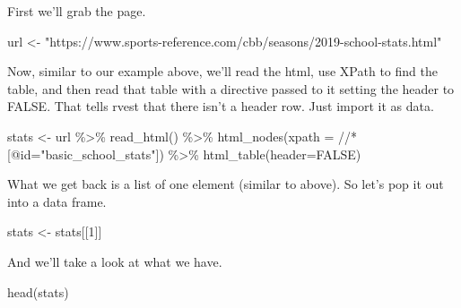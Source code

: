 \documentclass[
]{book}
\newenvironment{Shaded}{\begin{snugshade}}{\end{snugshade}}
\newcommand{\AttributeTok}[1]{\textcolor[rgb]{0.77,0.63,0.00}{#1}}
\newcommand{\ConstantTok}[1]{\textcolor[rgb]{0.00,0.00,0.00}{#1}}
\newcommand{\DecValTok}[1]{\textcolor[rgb]{0.00,0.00,0.81}{#1}}
\newcommand{\FunctionTok}[1]{\textcolor[rgb]{0.00,0.00,0.00}{#1}}
\newcommand{\NormalTok}[1]{#1}
\newcommand{\OtherTok}[1]{\textcolor[rgb]{0.56,0.35,0.01}{#1}}
\newcommand{\SpecialCharTok}[1]{\textcolor[rgb]{0.00,0.00,0.00}{#1}}
\newcommand{\StringTok}[1]{\textcolor[rgb]{0.31,0.60,0.02}{#1}}
\begin{document}
First we'll grab the page.

\begin{Shaded}
\begin{Highlighting}[]
\NormalTok{url }\OtherTok{\textless{}{-}} \StringTok{"https://www.sports{-}reference.com/cbb/seasons/2019{-}school{-}stats.html"}
\end{Highlighting}
\end{Shaded}

Now, similar to our example above, we'll read the html, use XPath to find the table, and then read that table with a directive passed to it setting the header to FALSE. That tells rvest that there isn't a header row. Just import it as data.

\begin{Shaded}
\begin{Highlighting}[]
\NormalTok{stats }\OtherTok{\textless{}{-}}\NormalTok{ url }\SpecialCharTok{\%\textgreater{}\%}
  \FunctionTok{read\_html}\NormalTok{() }\SpecialCharTok{\%\textgreater{}\%}
  \FunctionTok{html\_nodes}\NormalTok{(}\AttributeTok{xpath =} \StringTok{\textquotesingle{}//*[@id="basic\_school\_stats"]\textquotesingle{}}\NormalTok{) }\SpecialCharTok{\%\textgreater{}\%}
  \FunctionTok{html\_table}\NormalTok{(}\AttributeTok{header=}\ConstantTok{FALSE}\NormalTok{)}
\end{Highlighting}
\end{Shaded}

What we get back is a list of one element (similar to above). So let's pop it out into a data frame.

\begin{Shaded}
\begin{Highlighting}[]
\NormalTok{stats }\OtherTok{\textless{}{-}}\NormalTok{ stats[[}\DecValTok{1}\NormalTok{]]}
\end{Highlighting}
\end{Shaded}

And we'll take a look at what we have.

\begin{Shaded}
\begin{Highlighting}[]
\FunctionTok{head}\NormalTok{(stats)}
\end{Highlighting}
\end{Shaded}
\end{document}
